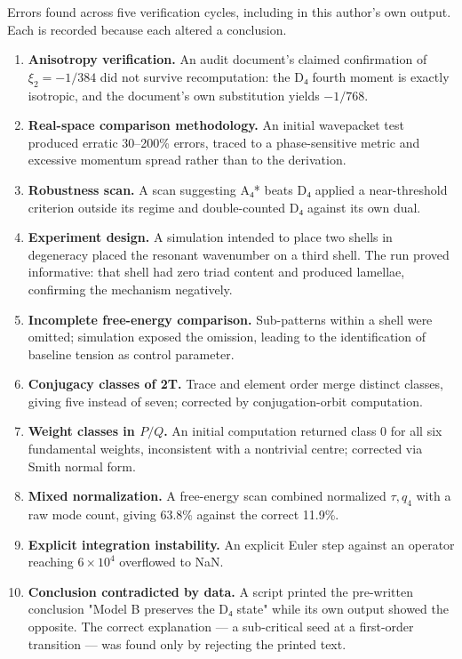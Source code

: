 \documentclass[a4paper,11pt]{article}
\begin{document}
Errors found across five verification cycles, including in this author's own output. Each is recorded because each altered a conclusion.

\begin{enumerate}
\item \textbf{Anisotropy verification.} An audit document's claimed confirmation of $\xi_2=-1/384$ did not survive recomputation: the D₄ fourth moment is exactly isotropic, and the document's own substitution yields $-1/768$.
\item \textbf{Real-space comparison methodology.} An initial wavepacket test produced erratic 30–200\% errors, traced to a phase-sensitive metric and excessive momentum spread rather than to the derivation.
\item \textbf{Robustness scan.} A scan suggesting A₄* beats D₄ applied a near-threshold criterion outside its regime and double-counted D₄ against its own dual.
\item \textbf{Experiment design.} A simulation intended to place two shells in degeneracy placed the resonant wavenumber on a third shell. The run proved informative: that shell had zero triad content and produced lamellae, confirming the mechanism negatively.
\item \textbf{Incomplete free-energy comparison.} Sub-patterns within a shell were omitted; simulation exposed the omission, leading to the identification of baseline tension as control parameter.
\item \textbf{Conjugacy classes of 2T.} Trace and element order merge distinct classes, giving five instead of seven; corrected by conjugation-orbit computation.
\item \textbf{Weight classes in $P/Q$.} An initial computation returned class 0 for all six fundamental weights, inconsistent with a nontrivial centre; corrected via Smith normal form.
\item \textbf{Mixed normalization.} A free-energy scan combined normalized $\tau,q_4$ with a raw mode count, giving 63.8\% against the correct 11.9\%.
\item \textbf{Explicit integration instability.} An explicit Euler step against an operator reaching $6\times10^4$ overflowed to NaN.
\item \textbf{Conclusion contradicted by data.} A script printed the pre-written conclusion "Model B preserves the D₄ state" while its own output showed the opposite. The correct explanation — a sub-critical seed at a first-order transition — was found only by rejecting the printed text.

\end{enumerate}
\end{document}
